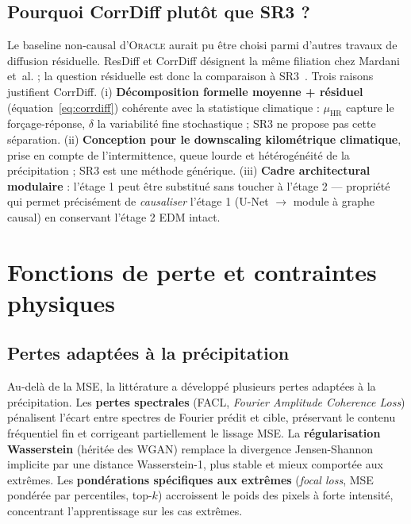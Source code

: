 \documentclass[14pt,a4paper,openany]{extreport}
\theoremstyle{definition}
\newcommand{\Oracle}{\textsc{Oracle}}
\newcommand{\HR}{\ensuremath{\text{HR}}}
\newcommand{\muHR}{\ensuremath{\mu_{\HR}}}
\begin{document}
\subsection{Pourquoi CorrDiff plutôt que SR3 ?}
\label{ssec:soa-corrdiff-choix}

Le baseline non-causal d'\Oracle{} aurait pu être choisi parmi d'autres travaux de diffusion résiduelle. ResDiff et CorrDiff désignent la même filiation chez Mardani et~al. ; la question résiduelle est donc la comparaison à SR3~\cite{saharia_sr3_2022}. Trois raisons justifient CorrDiff. (i) \textbf{Décomposition formelle moyenne + résiduel} (équation~\ref{eq:corrdiff}) cohérente avec la statistique climatique : $\muHR$ capture le forçage-réponse, $\delta$ la variabilité fine stochastique ; SR3 ne propose pas cette séparation. (ii) \textbf{Conception pour le downscaling kilométrique climatique}, prise en compte de l'intermittence, queue lourde et hétérogénéité de la précipitation ; SR3 est une méthode générique. (iii) \textbf{Cadre architectural modulaire} : l'étage 1 peut être substitué sans toucher à l'étage 2 --- propriété qui permet précisément de \emph{causaliser} l'étage 1 (U-Net $\to$ module à graphe causal) en conservant l'étage 2 EDM intact.

\section{Fonctions de perte et contraintes physiques}
\label{sec:soa-pertes}

\subsection{Pertes adaptées à la précipitation}
\label{ssec:soa-pertes-precip}

Au-delà de la MSE, la littérature a développé plusieurs pertes adaptées à la précipitation. Les \textbf{pertes spectrales} (FACL, \emph{Fourier Amplitude Coherence Loss}) pénalisent l'écart entre spectres de Fourier prédit et cible, préservant le contenu fréquentiel fin et corrigeant partiellement le lissage MSE. La \textbf{régularisation Wasserstein} (héritée des WGAN) remplace la divergence Jensen-Shannon implicite par une distance Wasserstein-1, plus stable et mieux comportée aux extrêmes. Les \textbf{pondérations spécifiques aux extrêmes} (\emph{focal loss}, MSE pondérée par percentiles, top-$k$) accroissent le poids des pixels à forte intensité, concentrant l'apprentissage sur les cas extrêmes.
\end{document}
